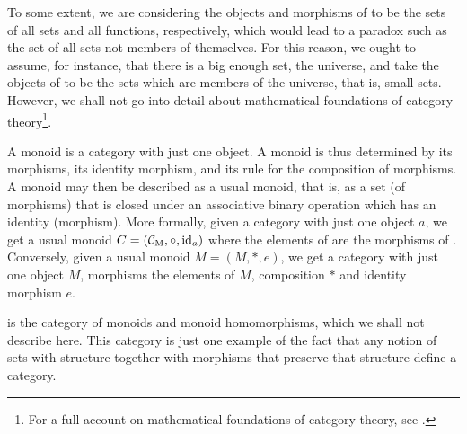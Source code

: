 \begin{example}
\begin{remark}
    To some extent, we are considering the objects and morphisms of
    \set to be the sets of all sets and all functions, respectively,
    which would lead to a paradox such as the set of all sets not
    members of themselves. For this reason, we ought to assume, for
    instance, that there is a big enough set, the universe, and take
    the objects of \set to be the sets which are members of the
    universe, that is, small sets. However, we shall not go into
    detail about mathematical foundations of category
    theory\footnote{For a full account on mathematical foundations of
      category theory, see \parencites[§ 1.8]{awodey-2010}[§
        I.6]{maclane-1998}.}.

  \end{remark}

\end{example}

\begin{example}
  \label{ex:category-monoid}



  A monoid is a category with just one object. A monoid is thus
  determined by its morphisms, its identity morphism, and its rule for
  the composition of morphisms. A monoid may then be described as a
  usual monoid, that is, as a set (of morphisms) that is closed under
  an associative binary operation which has an identity (morphism).
  More formally, given a category  with just one object $a$, we
  get a usual monoid $C = (\mathcal{C}_{\operatorname{M}}, \mathrel{\circ}, \operatorname{id}_{a})$ where the
  elements of  are the morphisms of . Conversely, given
  a usual monoid $M = (M, *, e)$, we get a category  with just
  one object $M$, morphisms the elements of $M$, composition $*$ and
  identity morphism $e$.

  \begin{remark}
    \label{re:category-mon}


     is the category of monoids and monoid homomorphisms,
    which we shall not describe here. This category is just one
    example of the fact that any notion of sets with structure
    together with morphisms that preserve that structure define a
    category.

  \end{remark}

\end{example}

